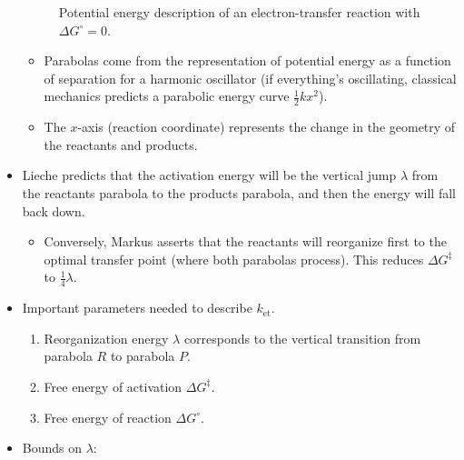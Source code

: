 \documentclass[../notes.tex]{subfiles}
\begin{document}
\begin{itemize}
\begin{figure}[H]
        \caption{Potential energy description of an electron-transfer reaction with $\Delta G^\circ=0$.}
        \label{fig:potentialEnergyParabolas}
    \end{figure}
    \begin{itemize}
        \item Parabolas come from the representation of potential energy as a function of separation for a harmonic oscillator (if everything's oscillating, classical mechanics predicts a parabolic energy curve $\frac{1}{2}kx^2$).
        \item The $x$-axis (reaction coordinate) represents the change in the geometry of the reactants and products.
    \end{itemize}
    \item Lieche predicts that the activation energy will be the vertical jump $\lambda$ from the reactants parabola to the products parabola, and then the energy will fall back down.
    \begin{itemize}
        \item Conversely, Markus asserts that the reactants will reorganize first to the optimal transfer point (where both parabolas process). This reduces $\Delta G^\ddagger$ to $\frac{1}{4}\lambda$.
    \end{itemize}
    \item Important parameters needed to describe $k_\text{et}$.
    \begin{enumerate}
        \item Reorganization energy $\lambda$ corresponds to the vertical transition from parabola $R$ to parabola $P$.
        \item Free energy of activation $\Delta G^\ddagger$.
        \item Free energy of reaction $\Delta G^\circ$.
    \end{enumerate}
    \item Bounds on $\lambda$:

\end{itemize}
\end{document}
